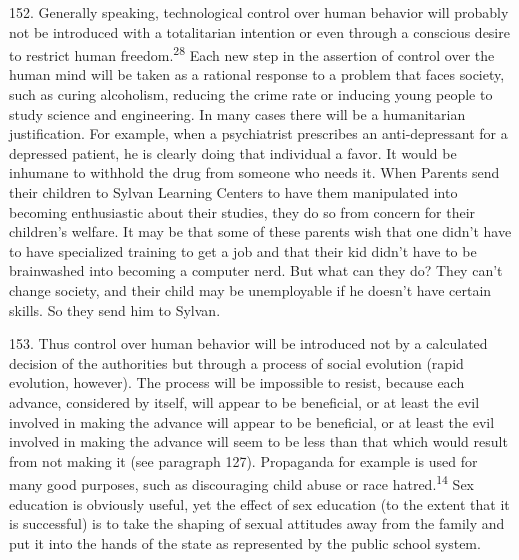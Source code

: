 \documentclass{article}
\begin{document}
152.  Generally  speaking,  technological  control  over  human  behavior  will  probably  not  be  
introduced  with  a  totalitarian  intention  or  even  through  a  conscious  desire  to  restrict  human  
freedom.\textsuperscript{28} Each new step in the assertion of control over the human mind will be taken as a rational 
response  to  a  problem  that  faces  society,  such  as  curing  alcoholism,  reducing  the  crime  rate  or  
inducing  young  people  to  study  science  and  engineering.   In  many  cases  there  will  be  a  
humanitarian justification.  For  example, when a psychiatrist prescribes an anti-depressant for a 
depressed patient, he is clearly doing that individual a favor.  It would be inhumane to withhold 
the drug from someone who needs it.  When Parents send their children to Sylvan Learning Centers 
to have them manipulated into becoming enthusiastic about their studies, they do so from concern 
for their children’s welfare.  It may be that some of these parents wish that one didn’t have to have 
specialized training to get a job and that their kid didn’t have to be brainwashed into becoming a 
computer  nerd.   But  what  can  they  do?  They  can’t  change  society,  and  their  child  may  be  
unemployable if he doesn’t have certain skills.  So they send him to Sylvan. \vspace{\baselineskip}
 
153.  Thus  control  over  human  behavior  will  be  introduced  not  by  a  calculated  decision  of  the  
authorities but through a process of social evolution (rapid evolution, however).  The process will 
be impossible to resist, because each advance, considered by itself, will appear to be beneficial, or 
at least the evil involved in making the advance  will appear to be beneficial, or at least the evil 
involved in making the advance will seem to be less than that which would result from not making 
it  (see  paragraph  127).   Propaganda  for  example  is  used  for  many  good  purposes,  such  as  
discouraging child abuse or race hatred.\textsuperscript{14} Sex education is obviously useful, yet the effect of 
sex education (to the extent that it is successful)  is to take the shaping of  sexual attitudes away 
from the family and put it into the hands of the state as represented by the public school system. \vspace{\baselineskip}
\end{document}
